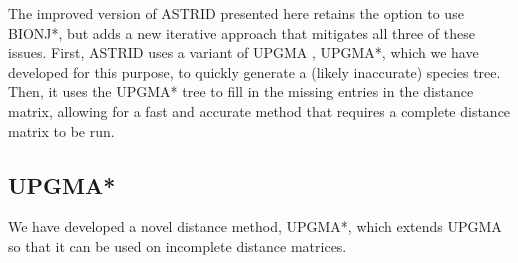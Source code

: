 The improved version of ASTRID presented here retains the option to use BIONJ*, but adds a new iterative approach that mitigates all three of these issues. First, ASTRID uses a variant of UPGMA \cite{sokal1958statistical}, UPGMA*, which we have developed for this purpose, to quickly generate a (likely inaccurate) species tree. Then, it uses the UPGMA* tree to fill in the missing entries in the distance matrix, allowing for a fast and accurate method that requires a complete distance matrix to be run.


\subsection{UPGMA*}

We have developed a novel distance method, UPGMA*, which extends UPGMA so that it can be used on incomplete distance matrices. 


